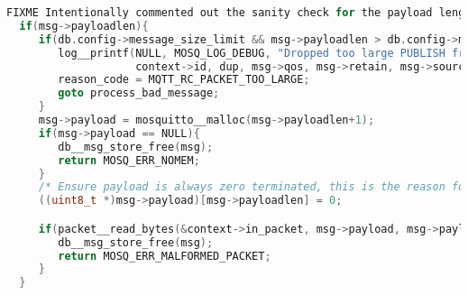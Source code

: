 
\begin{lstlisting}[language=c, caption={Sanity-Checks des Brokers nach erhalten einer Publish Nachricht in der Funktion
\texttt{handle\_\_publish} aus \texttt{src\/handle\_publish.c}},label={lst:mqtt-sainity-checks}]
  FIXME Intentionally commented out the sanity check for the payload length to be able to trigger buffer overflow
  if(msg->payloadlen){
     if(db.config->message_size_limit && msg->payloadlen > db.config->message_size_limit){
        log__printf(NULL, MOSQ_LOG_DEBUG, "Dropped too large PUBLISH from %s (d%d, q%d, r%d, m%d, '%s', ... (%ld bytes))",
                    context->id, dup, msg->qos, msg->retain, msg->source_mid, msg->topic, (long)msg->payloadlen);
        reason_code = MQTT_RC_PACKET_TOO_LARGE;
        goto process_bad_message;
     }
     msg->payload = mosquitto__malloc(msg->payloadlen+1);
     if(msg->payload == NULL){
        db__msg_store_free(msg);
        return MOSQ_ERR_NOMEM;
     }
     /* Ensure payload is always zero terminated, this is the reason for the extra byte above */
     ((uint8_t *)msg->payload)[msg->payloadlen] = 0;

     if(packet__read_bytes(&context->in_packet, msg->payload, msg->payloadlen)){
        db__msg_store_free(msg);
        return MOSQ_ERR_MALFORMED_PACKET;
     }
  }
\end{lstlisting}